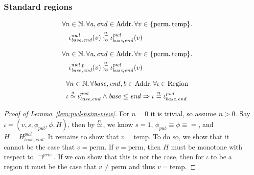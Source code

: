 \documentclass[a4paper]{article}
\newcommand{\nequal}[1][n]{\stackrel{\tiny{#1}}{=}}
\renewcommand{\nsim}[1][n]{\stackrel{\tiny{#1}}{\simeq}}
\newcommand\subsetsim{\mathrel{\ooalign{\raise.2ex\hbox{$\subset$}\cr
      \hidewidth\lower.8ex\hbox{\scalebox{0.9}{$\sim$}}\hidewidth\cr}}}
\newcommand{\nsubsim}[1][n]{\stackrel{\tiny{#1}}{\subsetsim}}
\newcommand{\var}[1]{\mathit{#1}}
\newcommand{\addr}{\var{a}}
\newcommand{\start}{\var{base}}
\newcommand{\addrend}{\var{end}}
\newcommand{\nwl}{\var{nwl}}
\newcommand{\pwl}{\var{pwl}}
\newcommand{\futurestr}{\mathbin{\sqsupseteq}^{\var{priv}}}
\newcommand{\plaindom}[1]{\mathrm{#1}}
\newcommand{\Addrs}{\plaindom{Addr}}
\newcommand{\nats}{\mathbb{N}}
\newcommand{\Regions}{\plaindom{Region}}
\newcommand{\plainview}[1]{\mathrm{#1}}
\newcommand{\perma}{\plainview{perm}}
\newcommand{\temp}{\plainview{temp}}
\begin{document}
\begin{lemma}
\subsubsection{Standard regions}
\begin{lemma}
  \label{lem:nwl-subset-pwl}
  \begin{align*}
    & \forall n \in \nats\ldotp \forall \addr, \addrend \in \Addrs \ldotp \forall v \in \{\perma, \temp\} \ldotp \\
    & \quad \iota^\nwl_{\start,\addrend} (v) \nsubsim \iota^\pwl_{\start,\addrend}(v)
  \end{align*}
\end{lemma}
\begin{lemma}
  \label{lem:nwlp-subset-pwl}
  \begin{align*}
    & \forall n \in \nats\ldotp \forall \addr, \addrend \in \Addrs \ldotp \forall v \in \{\perma, \temp\} \ldotp \\
    & \quad \iota^{\nwl,p}_{\start,\addrend} (v) \nsubsim \iota^\pwl_{\start,\addrend}(v)
  \end{align*}
\end{lemma}

\begin{lemma}
  \label{lem:pwl-nsim-view}
  \begin{align*}
    & \forall n \in \nats \ldotp \forall \start, \addrend, b \in \Addrs \ldotp \forall \iota \in \Regions \\
    & \iota \nsim \iota^\pwl_{\start,\addrend} \land \start \leq \addrend \Rightarrow \iota \nequal \iota^\pwl_{\start,\addrend}
  \end{align*}
\end{lemma}
\begin{proof}[Proof of Lemma~\ref{lem:pwl-nsim-view}]
  For $n = 0$ it is trivial, so assume $n > 0$.
  Say $\iota = (v,s,\phi_{\var{pub}},\phi,H)$, then by $\nsim$, we know $s = 1$, $\phi_{\var{pub}} \equiv \phi \equiv =$, and $H = H^\pwl_{\start,\addrend}$. It remains to show that $v=\temp$. To do so, we show that it cannot be the case that $v=\perma$. If $v = \perma$, then $H$ must be monotone with respect to $\futurestr$. If we can show that this is not the case, then for $\iota$ to be a region it must be the case that $v \neq \perma$ and thus $v = \temp$.


\end{proof}
\end{lemma}
\end{document}
